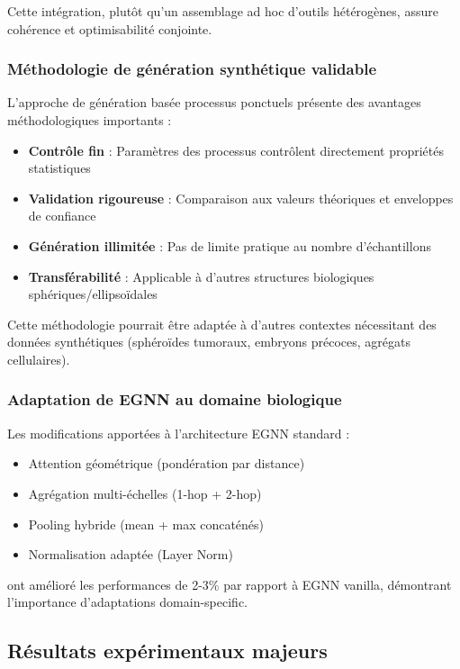 Cette intégration, plutôt qu'un assemblage ad hoc d'outils hétérogènes, assure cohérence et optimisabilité conjointe.

\subsubsection{Méthodologie de génération synthétique validable}

L'approche de génération basée processus ponctuels présente des avantages méthodologiques importants :
\begin{itemize}
    \item \textbf{Contrôle fin} : Paramètres des processus contrôlent directement propriétés statistiques
    \item \textbf{Validation rigoureuse} : Comparaison aux valeurs théoriques et enveloppes de confiance
    \item \textbf{Génération illimitée} : Pas de limite pratique au nombre d'échantillons
    \item \textbf{Transférabilité} : Applicable à d'autres structures biologiques sphériques/ellipsoïdales
\end{itemize}

Cette méthodologie pourrait être adaptée à d'autres contextes nécessitant des données synthétiques (sphéroïdes tumoraux, embryons précoces, agrégats cellulaires).

\subsubsection{Adaptation de EGNN au domaine biologique}

Les modifications apportées à l'architecture EGNN standard :
\begin{itemize}
    \item Attention géométrique (pondération par distance)
    \item Agrégation multi-échelles (1-hop + 2-hop)
    \item Pooling hybride (mean + max concaténés)
    \item Normalisation adaptée (Layer Norm)
\end{itemize}

ont amélioré les performances de 2-3\% par rapport à EGNN vanilla, démontrant l'importance d'adaptations domain-specific.

\subsection{Résultats expérimentaux majeurs}

